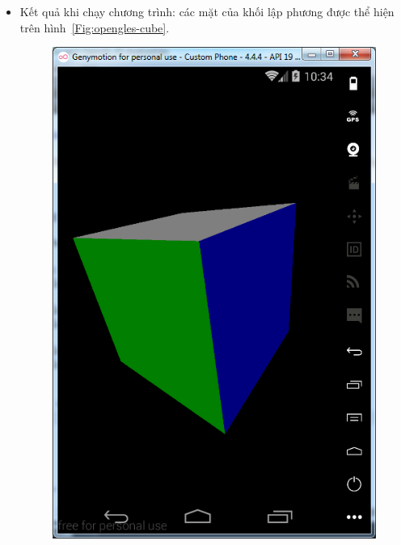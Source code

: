 \documentclass[13pt,a4paper]{extreport}
\begin{document}
\begin{enumerate}[{\it a.}]
\begin{itemize}
				\item Kết quả khi chạy chương trình: các mặt của khối lập phương được thể hiện trên hình~\ref{Fig:opengles-cube}.
					\begin{figure}[!h]
						\begin{center}
							\includegraphics[scale=.6]{images/opengles-cube-1.png}
							\hspace{.5cm}

\end{center}
\end{figure}
\end{itemize}
\end{enumerate}
\end{document}
